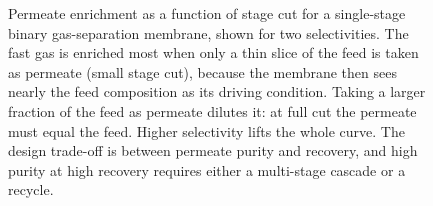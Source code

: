 \begin{figure}[htbp]
\centering
{}
\caption[Permeate purity versus stage cut for gas separation]{Permeate
enrichment as a function of stage cut for a single-stage binary
gas-separation membrane, shown for two selectivities. The fast gas is
enriched most when only a thin slice of the feed is taken as permeate
(small stage cut), because the membrane then sees nearly the feed
composition as its driving condition. Taking a larger fraction of the
feed as permeate dilutes it: at full cut the permeate must equal the feed.
Higher selectivity lifts the whole curve. The design trade-off is between
permeate purity and recovery, and high purity at high recovery requires
either a multi-stage cascade or a recycle.}
\label{fig:vol04ch07:membrane-cut}
\end{figure}
